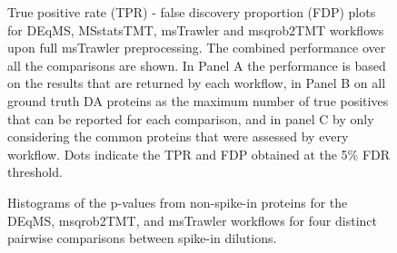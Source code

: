 \documentclass[
  letterpaper,
  DIV=11,
  numbers=noendperiod]{scrartcl}
\begin{document}
\begin{figure}[H]


\caption{\label{fig-WorkflowComparisonsPreprocessingSpikein2}True
positive rate (TPR) - false discovery proportion (FDP) plots for DEqMS,
MSstatsTMT, msTrawler and msqrob2TMT workflows upon full msTrawler
preprocessing. The combined performance over all the comparisons are
shown. In Panel A the performance is based on the results that are
returned by each workflow, in Panel B on all ground truth DA proteins as
the maximum number of true positives that can be reported for each
comparison, and in panel C by only considering the common proteins that
were assessed by every workflow. Dots indicate the TPR and FDP obtained
at the 5\% FDR threshold.}

\end{figure}%

\begin{figure}[H]


\caption{\label{fig-spikein2_pvalue_dist_nondiff}Histograms of the
p-values from non-spike-in proteins for the DEqMS, msqrob2TMT, and
msTrawler workflows for four distinct pairwise comparisons between
spike-in dilutions.}

\end{figure}%
\end{document}
